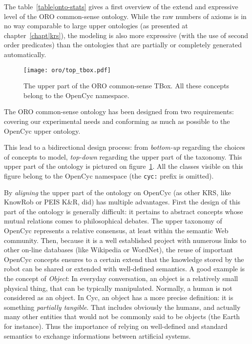 The table~\ref{table|onto-stats} gives a first overview of the extend and
expressive level of the ORO common-sense ontology. While the raw numbers of
axioms is in no way comparable to large upper ontologies (as presented at
chapter~\ref{chapt|krs}), the modeling is also more expressive (with the use of
second order predicates) than the ontologies that are partially or completely
generated automatically.

\begin{figure}
    \centering
    \texttt{[image: oro/top\_tbox.pdf]}

    \caption{The upper part of the ORO common-sense TBox. All these concepts
    belong to the {\sc OpenCyc} namespace.}
    
    \label{fig|upper_tbox}
\end{figure}

The ORO common-sense ontology has been designed from two requirements: covering
our experimental needs and conforming as much as possible to the {\sc OpenCyc}
upper ontology.

This lead to a bidirectional design process: from \emph{bottom-up} regarding
the choices of concepts to model, \emph{top-down} regarding the upper part of the
taxonomy. This upper part of the ontology is pictured on
figure~\ref{fig|upper_tbox}. All the classes visible on this figure belong to the
{\sc OpenCyc} namespace (the {\tt cyc:} prefix is omitted).

By \emph{aligning} the upper part of the ontology on {\sc OpenCyc} (as other
KRS, like {\sc KnowRob} or PEIS K\&R, did) has multiple advantages. First the
design of this part of the ontology is generally difficult: it pertains to
abstract concepts whose mutual relations comes to philosophical debates. The
upper taxonomy of {\sc OpenCyc} represents a relative consensus, at least
within the semantic Web community. Then, because it is a well established
project with numerous links to other on-line databases (like Wikipedia or
WordNet), the reuse of important {\sc OpenCyc} concepts ensures to a certain
extend that the knowledge stored by the robot can be shared or extended with
well-defined semantics. A good example is the concept of \emph{Object}: In
everyday conversation, an object is a relatively small physical thing, that can
be typically manipulated. Normally, a human is not considered as an object. In
{\sc Cyc}, an object has a more precise definition: it is something
\emph{partially tangible}. That includes obviously the humans, and actually
many other entities that would not be commonly said to be objects (the Earth
for instance). Thus the importance of relying on well-defined and standard
semantics to exchange informations between artificial systems.

